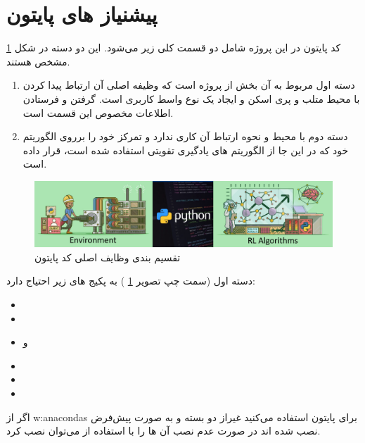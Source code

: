 \section{پیشنیاز های پایتون}

\begin{note}

کد پایتون در این پروژه شامل دو قسمت کلی زیر می‌شود. این دو دسته در شکل
\ref{fig:python-layers-env-alg}
مشخص هستند.
\begin{enumerate}
	\item 
	دسته اول مربوط به آن بخش از پروژه است که وظیفه اصلی آن ارتباط پیدا کردن با محیط متلب و پری اسکن و ایجاد یک نوع واسط کاربری است. گرفتن و فرستادن اطلاعات مخصوص این قسمت است.
	\item 
	دسته دوم با محیط و نحوه ارتباط آن کاری ندارد و تمرکز خود را بر‌روی الگوریتم خود که در این جا از الگوریتم های یادگیری تقویتی استفاده شده است، قرار داده است.
\end{enumerate}

\end{note}

\begin{figure}
	\centering
	\includegraphics[width=\linewidth]{Figures/python-layers-env-alg}
	\caption{تقسیم بندی وظایف اصلی کد پایتون}
	\label{fig:python-layers-env-alg}
\end{figure}


دسته اول (سمت چپ تصویر
\ref{fig:python-layers-env-alg}
)
به پکیج های زیر احتیاج دارد:
\begin{multicols}{3}
\begin{itemize}
	\item {} \item {} \item{} و  \item {}
	\item {} \item {}
\end{itemize}
\end{multicols}
اگر از 
\glspl{w:anaconda}
برای پایتون استفاده می‌کنید غیراز دو بسته 
و 
به صورت پیش‌فرض نصب شده اند در صورت عدم نصب آن ها را با استفاده از 
می‌توان نصب کرد.


